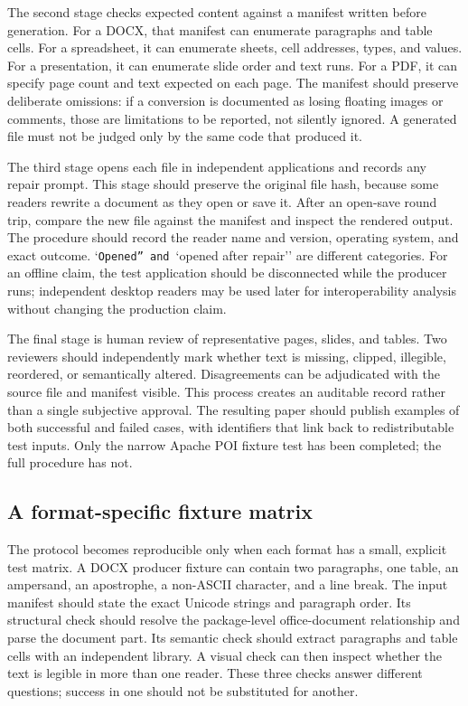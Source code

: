 \documentclass[10pt,letterpaper]{article}
\begin{document}
The second stage checks expected content against a manifest written before generation. For a DOCX, that manifest can enumerate paragraphs and table cells. For a spreadsheet, it can enumerate sheets, cell addresses, types, and values. For a presentation, it can enumerate slide order and text runs. For a PDF, it can specify page count and text expected on each page. The manifest should preserve deliberate omissions: if a conversion is documented as losing floating images or comments, those are limitations to be reported, not silently ignored. A generated file must not be judged only by the same code that produced it.

The third stage opens each file in independent applications and records any repair prompt. This stage should preserve the original file hash, because some readers rewrite a document as they open or save it. After an open-save round trip, compare the new file against the manifest and inspect the rendered output. The procedure should record the reader name and version, operating system, and exact outcome. `\texttt{Opened'' and }`opened after repair'' are different categories. For an offline claim, the test application should be disconnected while the producer runs; independent desktop readers may be used later for interoperability analysis without changing the production claim.

The final stage is human review of representative pages, slides, and tables. Two reviewers should independently mark whether text is missing, clipped, illegible, reordered, or semantically altered. Disagreements can be adjudicated with the source file and manifest visible. This process creates an auditable record rather than a single subjective approval. The resulting paper should publish examples of both successful and failed cases, with identifiers that link back to redistributable test inputs. Only the narrow Apache POI fixture test has been completed; the full procedure has not.

\subsection{A format-specific fixture matrix}

The protocol becomes reproducible only when each format has a small, explicit test matrix. A DOCX producer fixture can contain two paragraphs, one table, an ampersand, an apostrophe, a non-ASCII character, and a line break. The input manifest should state the exact Unicode strings and paragraph order. Its structural check should resolve the package-level office-document relationship and parse the document part. Its semantic check should extract paragraphs and table cells with an independent library. A visual check can then inspect whether the text is legible in more than one reader. These three checks answer different questions; success in one should not be substituted for another.
\end{document}
